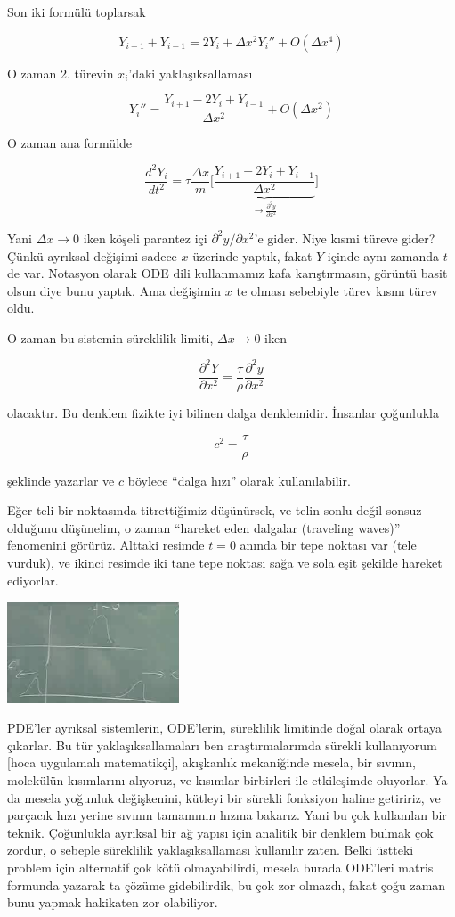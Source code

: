 \documentclass[12pt,fleqn]{article}\usepackage{../../common}
\begin{document}
Son iki formülü toplarsak

$$ Y_{i+1} + Y_{i-1} = 2Y_i + \Delta x^2 Y_i''  + O(\Delta x^4)$$

O zaman 2. türevin $x_i$'daki yaklaşıksallaması 

$$ Y_i'' = \frac{Y_{i+1} - 2Y_i + Y_{i-1}}{\Delta x^2} + O(\Delta x^2) $$

O zaman ana formülde

$$ \frac{d^2Y_i}{dt^2} = 
\tau \frac{\Delta x}{m} \bigg[\underbrace{
\frac{Y_{i+1} - 2Y_i + Y_{i-1}}{\Delta x^2}
}_{\to \frac{\partial ^2y}{\partial x^2}}
\bigg]
$$

Yani $\Delta x \to 0$ iken köşeli parantez içi $\partial ^2y/\partial x^2$'e
gider. Niye kısmi türeve gider? Çünkü ayrıksal değişimi sadece $x$ üzerinde
yaptık, fakat $Y$ içinde aynı zamanda $t$ de var. Notasyon olarak ODE dili
kullanmamız kafa karıştırmasın, görüntü basit olsun diye bunu yaptık. Ama
değişimin $x$ te olması sebebiyle türev kısmı türev oldu.

O zaman bu sistemin süreklilik limiti, $\Delta x \to 0$ iken

$$ 
\frac{\partial ^2Y}{\partial x^2} = 
\frac{\tau}{\rho}\frac{\partial ^2y}{\partial x^2}
 $$

olacaktır. Bu denklem fizikte iyi bilinen dalga denklemidir. İnsanlar
çoğunlukla 

$$ c^2 = \frac{\tau}{\rho} $$

şeklinde yazarlar ve $c$ böylece ``dalga hızı'' olarak kullanılabilir. 

Eğer teli bir noktasında titrettiğimiz düşünürsek, ve telin sonlu değil
sonsuz olduğunu düşünelim, o zaman ``hareket eden dalgalar (traveling
waves)'' fenomenini görürüz. Alttaki resimde $t=0$ anında bir tepe noktası
var (tele vurduk), ve ikinci resimde iki tane tepe noktası sağa ve sola
eşit şekilde hareket ediyorlar. 

\includegraphics[height=3cm]{1_10.png}

PDE'ler ayrıksal sistemlerin, ODE'lerin, süreklilik limitinde doğal olarak
ortaya çıkarlar. Bu tür yaklaşıksallamaları ben araştırmalarımda sürekli
kullanıyorum [hoca uygulamalı matematikçi], akışkanlık mekaniğinde mesela,
bir sıvının, molekülün kısımlarını alıyoruz, ve kısımlar birbirleri ile
etkileşimde oluyorlar. Ya da mesela yoğunluk değişkenini, kütleyi bir
sürekli fonksiyon haline getiririz, ve parçacık hızı yerine sıvının
tamamının hızına bakarız. Yani bu çok kullanılan bir teknik. Çoğunlukla
ayrıksal bir ağ yapısı için analitik bir denklem bulmak çok zordur, o
sebeple süreklilik yaklaşıksallaması kullanılır zaten. Belki üstteki
problem için alternatif çok kötü olmayabilirdi, mesela burada ODE'leri
matris formunda yazarak ta çözüme gidebilirdik, bu çok zor olmazdı, fakat
çoğu zaman bunu yapmak hakikaten zor olabiliyor.
\end{document}
